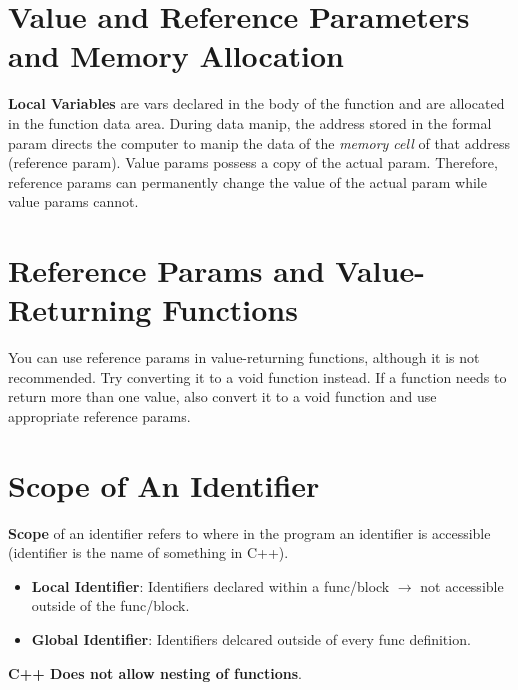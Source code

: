 \documentclass{article}
\begin{document}
\section{Value and Reference Parameters and Memory Allocation}
\textbf{Local Variables} are vars declared in the body of the function and are
allocated in the function data area. During data manip, the address stored in
the formal param directs the computer to manip the data of the \textit{memory
cell} of that address (reference param). Value params possess a copy of the
actual param. Therefore, reference params can permanently change the value of
the actual param while value params cannot.

\section{Reference Params and Value-Returning Functions}
You can use reference params in value-returning functions, although it is not
recommended. Try converting it to a void function instead. If a function needs
to return more than one value, also convert it to a void function and use
appropriate reference params.

\section{Scope of An Identifier}
\textbf{Scope} of an identifier refers to where in the program an identifier is
accessible (identifier is the name of something in C++).

\begin{itemize}
  \item \textbf{Local Identifier}: Identifiers declared within a func/block
     $\rightarrow$ not accessible outside of the func/block.
  \item \textbf{Global Identifier}: Identifiers delcared outside of every func
    definition.
\end{itemize}

\textbf{C++ Does not allow nesting of functions}.
\end{document}
